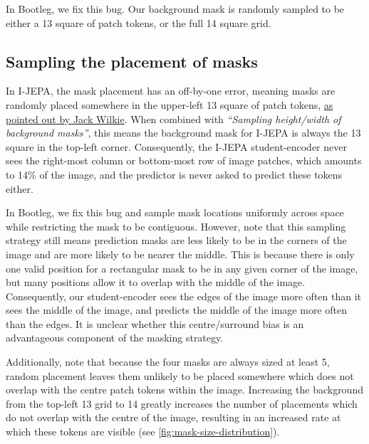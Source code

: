 In Bootleg, we fix this bug.
Our background mask is randomly sampled to be either a 13 square of patch tokens, or the full 14 square grid.


\subsection{Sampling the placement of masks}
In I-JEPA, the mask placement has an off-by-one error, meaning masks are randomly placed somewhere in the upper-left 13 square of patch tokens, \href{https://github.com/facebookresearch/ijepa/pull/40}{as pointed out by Jack Wilkie}.
When combined with \iftoggle{arxiv}{\cref{s:masking:background},}{the previous item} \textit{``Sampling height/width of background masks''}, this means the background mask for I-JEPA is always the 13 square in the top-left corner.
Consequently, the I-JEPA student-encoder never sees the right-most column or bottom-most row of image patches, which amounts to 14\% of the image, and the predictor is never asked to predict these tokens either.

In Bootleg, we fix this bug and sample mask locations uniformly across space while restricting the mask to be contiguous.
However, note that this sampling strategy still means prediction masks are less likely to be in the corners of the image and are more likely to be nearer the middle.
This is because there is only one valid position for a rectangular mask to be in any given corner of the image, but many positions allow it to overlap with the middle of the image.
Consequently, our student-encoder sees the edges of the image more often than it sees the middle of the image, and predicts the middle of the image more often than the edges.
It is unclear whether this centre/surround bias is an advantageous component of the masking strategy.

Additionally, note that because the four masks are always sized at least 5, random placement leaves them unlikely to be placed somewhere which does not overlap with the centre patch tokens within the image.
Increasing the background from the top-left 13 grid to 14 greatly increases the number of placements which do not overlap with the centre of the image, resulting in an increased rate at which these tokens are visible (see \cref{fig:mask-size-distribution}).

